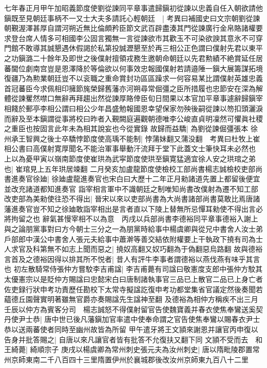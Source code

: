 七年春正月甲午加昭義節度使劉從諫同平章事遣歸鎭初從諫以忠義自任入朝欲請他鎭既至見朝廷事柄不一又士大夫多請託心輕朝廷　|{
	考異曰補國史曰文宗朝劉從諫朝覲渥澤甚厚自謂河朔近無比倫頗矜臣節文武百辟盡湊其門從諫廣行金帛賂諸權要求登台席人情多可相國李公固言獨無一言從諫欲市其歡玉不可染欲諛其意氷不可穿門館不敢導其誠懇遇休假謁於私第投誠瀝懇至於再三相公正色謂曰僕射先君以東平之功鎭潞二十餘年及即世之後僕射擅領戎務生邀朝命朝廷以先君勲績不絶賞延任居蕃閫位劇南宫豈是恩澤降於等倫欲以何事效忠報國僕射若請邉陲一鎭大展籌謀拓境復疆乃為勲業朝廷豈不以衮職之重命賞封功區區躁求一何容易某比謂僕射英雄忠義首冠蕃臣今求佩相印擁節旄榮歸舊藩亦河朔尋常倔彊之臣所措履也忠節安在深為解體從諫矍然噤口無辭再拜趨出然從諫厚賂倖臣旬日間果以本官加平章事遽辭歸鎭宰相餞於郵亭李相公謂曰相公少年昌盛勉報國恩幸望保家勿殃後嗣從諫以笏扣頭灑淚而辭及至本鎭謂從事將校曰昨者入覲闕庭遍觀朝德唯李公峻直貞明凜然可懼眞社稷之重臣也按固言此年未為相其說妄也今從實錄}
故歸而益驕|{
	為劉從諫倔彊張本}
徐州承王智興之後士卒驕悖節度使高瑀不能制|{
	悖蒲妹翻又蒲没翻　考異曰杜牧上崔相公書曰高僕射寛厚聞名不能治軍事舉動汗流拜于堂下此蓋文士筆快耳未必然也}
上以為憂甲寅以嶺南節度使崔珙為武寜節度使珙至鎭寛猛適宜徐人安之珙琯之弟也|{
	崔琯見上五年珙居竦翻}
二月癸亥加盧龍節度使檢校工部尚書楊志誠檢校吏部尚書進奏官徐廸|{
	徐廸盧龍進奏官也宋白曰大歷十二年正月勑諸道先置上都留後便宜並改充諸道都知進奏官}
詣宰相言軍中不識朝廷之制唯知尚書改僕射為遷不知工部改吏部為美勑使往恐不得出|{
	晉宋以來以吏部尚書為大尚書諸部尚書莫敢比焉唐諸藩進奏官豈不知之徐廸敢詣宰相出是言者直以下陵上替無所忌憚耳勑使不得出言必將拘留之也}
辭氣甚慢宰相不以為意　丙戌以兵部尚書李德裕同平章事德裕入謝上與之論朋黨事對曰方今朝士三分之一為朋黨時給事中楊虞卿與從兄中書舍人汝士弟戶部郎中漢公中書舍人張元夫給事中蕭澣等善交結依附權要上干執政下撓有司為士人求官及科第無不如志上聞而惡之|{
	撓奴高翻又奴巧翻為于偽翻惡烏路翻}
故與德裕言首及之德裕因得以排其所不悦者|{
	昔人有評牛李事者謂德裕以燕伐燕有味乎其言也}
初左散騎常侍張仲方嘗駮李吉甫諡|{
	李吉甫薨有司諡曰敬憲度支郎中張仲方駮其太優憲宗以是貶仲方賜諡曰忠懿宋白曰唐制諸執事官三品已上散官二品已上身亡者佐吏録行狀申考功責歷任勘校下太常寺擬諡訖復申考功都堂集省官議定然後奏聞若藴德丘園聲實明著雖無官爵亦奏賜諡先生諡神至翻}
及德裕為相仲方稱疾不出三月壬辰以仲方為賓客分司　楊志誠怒不得僕射留官告使魏寶義并春衣使焦奉鸞送奚契丹使尹士恭|{
	唐中世已後凡藩鎭加官率遣中使奉命謂之官告使焦奉鸞以賜春衣尹士恭以送兩蕃使者同時至幽州故皆為所留}
甲午遣牙將王文頴來謝恩并讓官丙申復以告身并批答賜之|{
	自唐以來凡讓官者皆有批答不允復扶又翻下同}
文頴不受而去　和王綺薨|{
	綺順宗子}
庚戌以楊虞卿為常州刺史張元夫為汝州刺史|{
	唐以隋毗陵郡置常州京師東南二千八百四十三里隋置伊州於襄城郡後改汝州京師東九百八十二里}
